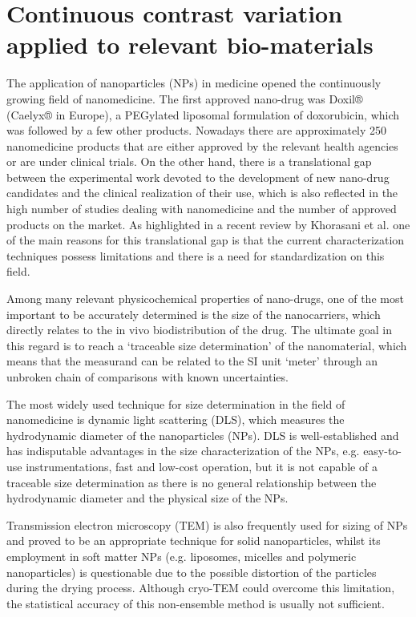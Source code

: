 \chapter{Continuous contrast variation applied to relevant bio-materials}
\label{chap:bio_applications}

The application of nanoparticles (NPs) in medicine opened the continuously growing field of nanomedicine. The first approved nano-drug was Doxil® (Caelyx® in Europe), a PEGylated liposomal formulation of doxorubicin, which was followed by a few other products. Nowadays there are approximately 250 nanomedicine products that are either approved by the relevant health agencies or are under clinical trials. On the other hand, there is a translational gap between the experimental work devoted to the development of new nano-drug candidates and the clinical realization of their use, which is also reflected in the high number of studies dealing with nanomedicine and the number of approved products on the market. As highlighted in a recent review by Khorasani et al. one of the main reasons for this translational gap is that the current characterization techniques possess limitations and there is a need for standardization on this field.

Among many relevant physicochemical properties of nano-drugs, one of the most important to be accurately determined is the size of the nanocarriers, which directly relates to the in vivo biodistribution of the drug. The ultimate goal in this regard is to reach a ‘traceable size determination’ of the nanomaterial, which means that the measurand can be related to the SI unit ‘meter’ through an unbroken chain of comparisons with known uncertainties. 

The most widely used technique for size determination in the field of nanomedicine is dynamic light scattering (DLS), which measures the hydrodynamic diameter of the nanoparticles (NPs). DLS is well-established and has indisputable advantages in the size characterization of the NPs, e.g. easy-to-use instrumentations, fast and low-cost operation, but it is not capable of a traceable size determination as there is no general relationship between the hydrodynamic diameter and the physical size of the NPs. 

Transmission electron microscopy (TEM) is also frequently used for sizing of NPs and proved to be an appropriate technique for solid nanoparticles, whilst its employment in soft matter NPs (e.g. liposomes, micelles and polymeric nanoparticles) is questionable due to the possible distortion of the particles during the drying process.  Although cryo-TEM could overcome this limitation, the statistical accuracy of this non-ensemble method is usually not sufficient.
 
